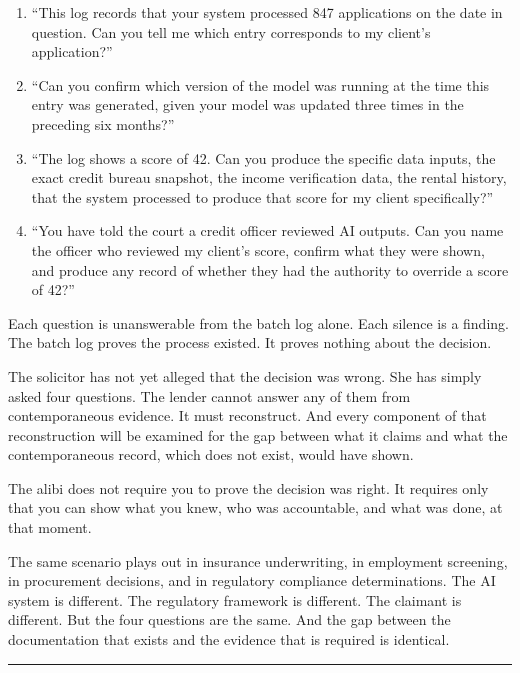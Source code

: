 \begin{enumerate}
\def\labelenumi{\arabic{enumi}.}
\tightlist
\item
  ``This log records that your system processed 847 applications on the date in question. Can you tell me which entry corresponds to my client's application?''
\item
  ``Can you confirm which version of the model was running at the time this entry was generated, given your model was updated three times in the preceding six months?''
\item
  ``The log shows a score of 42. Can you produce the specific data inputs, the exact credit bureau snapshot, the income verification data, the rental history, that the system processed to produce that score for my client specifically?''
\item
  ``You have told the court a credit officer reviewed AI outputs. Can you name the officer who reviewed my client's score, confirm what they were shown, and produce any record of whether they had the authority to override a score of 42?''
\end{enumerate}

Each question is unanswerable from the batch log alone. Each silence is a finding. The batch log proves the process existed. It proves nothing about the decision.

The solicitor has not yet alleged that the decision was wrong. She has simply asked four questions. The lender cannot answer any of them from contemporaneous evidence. It must reconstruct. And every component of that reconstruction will be examined for the gap between what it claims and what the contemporaneous record, which does not exist, would have shown.

The alibi does not require you to prove the decision was right. It requires only that you can show what you knew, who was accountable, and what was done, at that moment.

The same scenario plays out in insurance underwriting, in employment screening, in procurement decisions, and in regulatory compliance determinations. The AI system is different. The regulatory framework is different. The claimant is different. But the four questions are the same. And the gap between the documentation that exists and the evidence that is required is identical.

\begin{center}\rule{0.5\linewidth}{0.5pt}\end{center}

